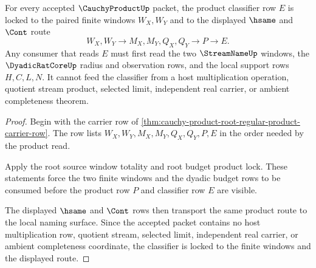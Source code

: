 \begin{theorem}
\label{thm:cauchy-product-root-shared-window-product-classifier}
For every accepted $\CauchyProductUp$ packet, the product classifier row $E$ is locked to the paired finite windows $W_X,W_Y$ and to the displayed $\hsame$ and $\Cont$ route
$$
W_X,W_Y \to M_X,M_Y,Q_X,Q_Y \to P \to E.
$$
Any consumer that reads $E$ must first read the two $\StreamNameUp$ windows, the $\DyadicRatCoreUp$ radius and observation rows, and the local support rows $H,C,L,N$. It cannot feed the classifier from a host multiplication operation, quotient stream product, selected limit, independent real carrier, or ambient completeness theorem.
\end{theorem}
\begin{proof}
Begin with the carrier row of \autoref{thm:cauchy-product-root-regular-product-carrier-row}. The row lists $W_X,W_Y,M_X,M_Y,Q_X,Q_Y,P,E$ in the order needed by the product read.

Apply the root source window totality and root budget product lock. These statements force the two finite windows and the dyadic budget rows to be consumed before the product row $P$ and classifier row $E$ are visible.

The displayed $\hsame$ and $\Cont$ rows then transport the same product route to the local naming surface. Since the accepted packet contains no host multiplication row, quotient stream, selected limit, independent real carrier, or ambient completeness coordinate, the classifier is locked to the finite windows and the displayed route.
\end{proof}

